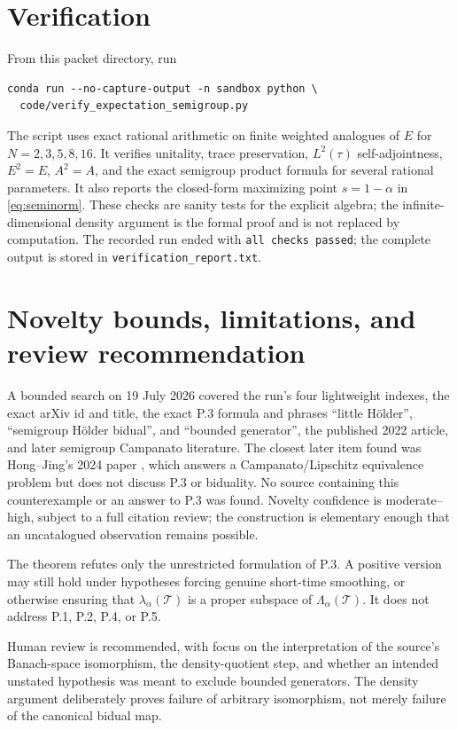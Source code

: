\documentclass[11pt]{article}
\newcommand{\T}{\mathcal T}
\begin{document}
\section{Verification}

From this packet directory, run
\begin{verbatim}
conda run --no-capture-output -n sandbox python \
  code/verify_expectation_semigroup.py
\end{verbatim}
The script uses exact rational arithmetic on finite weighted analogues of
$E$ for $N=2,3,5,8,16$.  It verifies unitality, trace preservation,
$L^2(\tau)$ self-adjointness, $E^2=E$, $A^2=A$, and the exact semigroup
product formula for several rational parameters.  It also reports the
closed-form maximizing point $s=1-\alpha$ in \eqref{eq:seminorm}.  These checks
are sanity tests for the explicit algebra; the infinite-dimensional density
argument is the formal proof and is not replaced by computation.
The recorded run ended with \texttt{all checks passed}; the complete output is
stored in \texttt{verification\_report.txt}.

\section{Novelty bounds, limitations, and review recommendation}

A bounded search on 19 July 2026 covered the run's four lightweight indexes,
the exact arXiv id and title, the exact P.3 formula and phrases ``little
H\"older'', ``semigroup H\"older bidual'', and ``bounded generator'', the
published 2022 article, and later semigroup Campanato literature.  The closest
later item found was Hong--Jing's 2024 paper \cite{HongJing}, which answers a
Campanato/Lipschitz equivalence problem but does not discuss P.3 or biduality.
No source containing this counterexample or an answer to P.3 was found.
Novelty confidence is moderate--high, subject to a full citation review; the
construction is elementary enough that an uncatalogued observation remains
possible.

The theorem refutes only the unrestricted formulation of P.3.  A positive
version may still hold under hypotheses forcing genuine short-time smoothing,
or otherwise ensuring that $\lambda_\alpha(\T)$ is a proper subspace of
$\Lambda_\alpha(\T)$.  It does not address P.1, P.2, P.4, or P.5.

Human review is recommended, with focus on the interpretation of the source's
Banach-space isomorphism, the density-quotient step, and whether an intended
unstated hypothesis was meant to exclude bounded generators.  The density
argument deliberately proves failure of arbitrary isomorphism, not merely
failure of the canonical bidual map.
\end{document}
